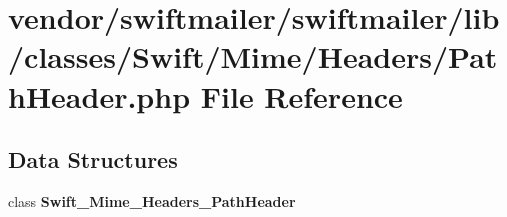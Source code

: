 \section{vendor/swiftmailer/swiftmailer/lib/classes/\+Swift/\+Mime/\+Headers/\+Path\+Header.php File Reference}
\label{_path_header_8php}
\subsection*{Data Structures}
\begin{DoxyCompactItemize}
\item 
class {\bf Swift\+\_\+\+Mime\+\_\+\+Headers\+\_\+\+Path\+Header}
\end{DoxyCompactItemize}
